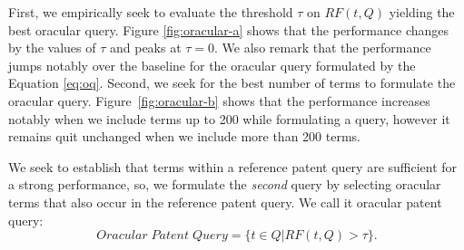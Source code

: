 First, we empirically seek to evaluate the threshold $\tau$ on $RF(t,Q)$ yielding the best oracular query.
Figure \ref{fig:oracular-a} shows that the performance changes by the values of $\tau$ and peaks at $\tau=0$. We also remark that the performance jumps notably over the baseline for the oracular query formulated by the Equation \ref{eq:oq}. Second, we seek for the best number of terms to formulate the oracular query. 
Figure~\ref{fig:oracular-b} shows that the performance increases notably when we include terms up to 200 while formulating a query, however it remains quit unchanged when we include more than 200 terms. 

We seek to establish that terms within a reference patent query are sufficient for a strong performance, so, we formulate the \textit{second} query by selecting oracular terms that also occur in the reference patent query. We call it oracular patent query:
\begin{equation}
 Oracular \; Patent \; Query = \{t\in Q|RF(t, Q)>\tau\}.   
 \label{eq:score}
\end{equation}
